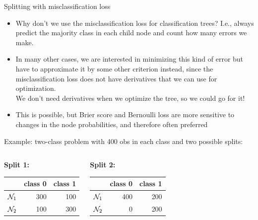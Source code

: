 \documentclass[11pt,compress,t,notes=noshow, xcolor=table]{beamer}
\begin{document}
\begin{vbframe}{Splitting with misclassification loss}

\begin{itemize}
\item Why don't we use the misclassification loss for classification trees? I.e., always predict the majority class in each child node and count how many errors we make.
\item In many other cases, we are interested in minimizing this kind of error but have to approximate it by some other criterion instead, since the misclassification loss does not have derivatives that we can use for optimization.\\
We don't need derivatives when we optimize the tree, so we could go for it!
\item This is possible, but Brier score and Bernoulli loss are more sensitive to changes in the node probabilities, and  therefore often preferred
\end{itemize}

\framebreak

Example: two-class problem with 400 obs in each class and two possible splits:
\begin{small}
\begin{columns}[T,onlytextwidth]
\begin{center}
\textbf{Split 1:} \\
\vspace{0.25cm}
\begin{table}[ht]
\centering
\begin{tabular}{rrr}
  \hline
 & class 0 & class 1 \\ 
  \hline
$\mathcal{N}_1$ & 300 & 100 \\ 
  $\mathcal{N}_2$ & 100 & 300 \\ 
   \hline
\end{tabular}
\end{table}

\end{center}
\begin{center}
\textbf{Split 2:} \\
\vspace{0.25cm}
\begin{table}[ht]
\centering
\begin{tabular}{rrr}
  \hline
 & class 0 & class 1 \\ 
  \hline
$\mathcal{N}_1$ & 400 & 200 \\ 
  $\mathcal{N}_2$ &   0 & 200 \\ 
   \hline
\end{tabular}
\end{table}


\end{center}
\end{columns}
\end{small}
\end{vbframe}
\end{document}
